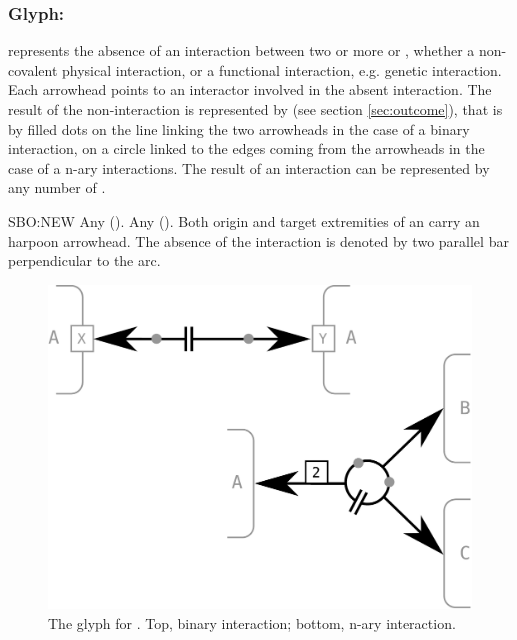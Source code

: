 \color{red}

\subsubsection{Glyph: }\label{sec:non-interaction}

 represents the absence of an interaction between two or more  or , whether a non-covalent physical interaction, or a functional interaction, e.g. genetic interaction. Each arrowhead points to an interactor involved in the absent interaction. The result of the non-interaction is represented by  (see section \ref{sec:outcome}), that is by filled dots on the line linking the two arrowheads in the case of a binary interaction, on a circle linked to the edges coming from the arrowheads in the case of a  n-ary interactions. The result of an interaction can be represented by any number of .

\begin{glyphDescription}
 \glyphSboTerm SBO:NEW
 \glyphOrigin Any  ().
 \glyphTarget Any  ().
 \glyphEndPoint Both origin and target extremities of an  carry an harpoon arrowhead. The absence of the interaction is denoted by two parallel bar perpendicular to the arc.
 \end{glyphDescription}

\begin{figure}[H]
  \centering
  \includegraphics[scale = 0.3]{images/non-interaction}
  \caption{The \ER glyph for . Top, binary interaction; bottom, n-ary interaction.}
  \label{fig:interaction}
\end{figure}
% 



\normalcolor